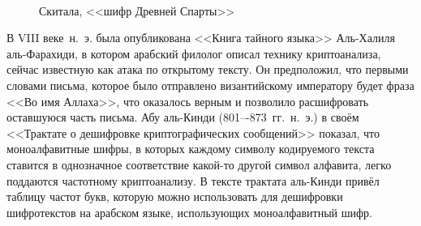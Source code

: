 \begin{figure}[tb]
	\centering
	~~~~
	\caption{Скитала, <<шифр Древней Спарты>>}
\end{figure}

В VIII веке~н.~э. была опубликована <<Книга тайного языка>> Аль-Халиля аль-Фарахиди, в котором арабский филолог описал технику криптоанализа, сейчас известную как атака по открытому тексту. Он предположил, что первыми словами письма, которое было отправлено византийскому императору будет фраза <<Во имя Аллаха>>, что оказалось верным и позволило расшифровать оставшуюся часть письма. Абу аль-Кинди (801–-873~гг.~н.~э.) в своём <<Трактате о дешифровке криптографических сообщений>> показал, что моноалфавитные шифры, в которых каждому символу кодируемого текста ставится в однозначное соответствие какой-то другой символ алфавита, легко поддаются частотному криптоанализу. В тексте трактата аль-Кинди привёл таблицу частот букв, которую можно использовать для дешифровки шифротекстов на арабском языке, использующих моноалфавитный шифр.

